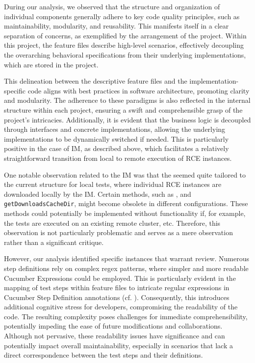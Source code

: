 During our analysis, we observed that the structure and organization of individual components generally adhere to key code quality principles, such as maintainability, modularity, and reusability. This manifests itself in a clear separation of concerns, as exemplified by the arrangement of the \texttt{} project. Within this project, the feature files describe high-level scenarios, effectively decoupling the overarching behavioral specifications from their underlying implementations, which are stored in the \texttt{} project. 

This delineation between the descriptive feature files and the implementation-specific code aligns with best practices in software architecture, promoting clarity and modularity. The adherence to these paradigms is also reflected in the internal structure within each project, ensuring a swift and comprehensible grasp of the project's intricacies. Additionally, it is evident that the business logic is decoupled through interfaces and concrete implementations, allowing the underlying implementations to be dynamically switched if needed. This is particularly positive in the case of \ac{IM}, as described above, which facilitates a relatively straightforward transition from local to remote execution of \ac{RCE} instances. 

One notable observation related to the \ac{IM} was that the \texttt{} seemed quite tailored to the current structure for local tests, where individual \ac{RCE} instances are downloaded locally by the \ac{IM}. Certain methods, such as \texttt{}, and \texttt{getDownloadsCacheDir}, might become obsolete in different configurations. These methods could potentially be implemented without functionality if, for example, the tests are executed on an existing remote cluster, etc. Therefore, this observation is not particularly problematic and serves as a mere observation rather than a significant critique.

However, our analysis identified specific instances that warrant review. Numerous step definitions rely on complex regex patterns, where simpler and more readable Cucumber Expressions could be employed. This is particularly evident in the mapping of test steps within feature files to intricate regular expressions in Cucumber Step Definition annotations (cf. ). Consequently, this introduces additional cognitive stress for developers, compromising the readability of the code. The resulting complexity poses challenges for immediate comprehensibility, potentially impeding the ease of future modifications and collaborations. Although not pervasive, these readability issues have significance and can potentially impact overall maintainability, especially in scenarios that lack a direct correspondence between the test steps and their definitions.
